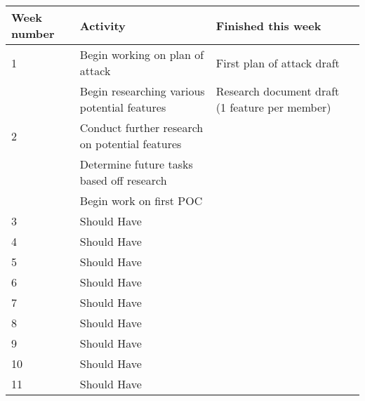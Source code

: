 \documentclass{article} %
\begin{document}
\begin{tabularx}{\textwidth}{|X|X|X|X|}
    \hline
    \textbf{Week number} & \textbf{Activity}                              & \textbf{Finished this week}                    \\ \hline
    1                    & Begin working on plan of attack                & First plan of attack draft                     \\ \hline
                         & Begin researching various potential features   & Research document draft (1 feature per member) \\ \hline
    2                    & Conduct further research on potential features &                                                \\ \hline
                         & Determine future tasks based off research      &                                                \\ \hline
                         & Begin work on first POC                        &                                                \\ \hline
    3                    & Should Have                                    &                                                \\ \hline
    4                    & Should Have                                    &                                                \\ \hline
    5                    & Should Have                                    &                                                \\ \hline
    6                    & Should Have                                    &                                                \\ \hline
    7                    & Should Have                                    &                                                \\ \hline
    8                    & Should Have                                    &                                                \\ \hline
    9                    & Should Have                                    &                                                \\ \hline
    10                   & Should Have                                    &                                                \\ \hline
    11                   & Should Have                                    &                                                \\ \hline

\end{tabularx}
\end{document}
